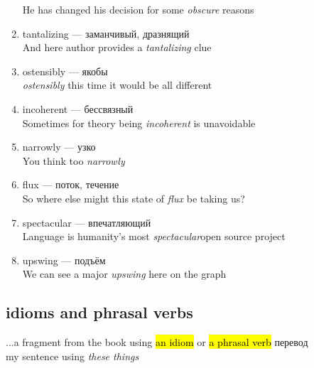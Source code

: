 \documentclass[
]{article}
\begin{document}
\begin{enumerate}
  He has changed his decision for some \emph{obscure} reasons
\item
  tantalizing --- заманчивый, дразнящий\\
  And here author provides a \emph{tantalizing} clue
\item
  ostensibly --- якобы\\
  \emph{ostensibly} this time it would be all different
\item
  incoherent --- бессвязный\\
  Sometimes for theory being \emph{incoherent} is unavoidable
\item
  narrowly --- узко\\
  You think too \emph{narrowly}
\item
  flux --- поток, течение\\
  So where else might this state of \emph{flux} be taking us?
\item
  spectacular --- впечатляющий\\
  Language is humanity's most \emph{spectacular}open source project
\item
  upswing --- подъём\\
  We can see a major \emph{upswing} here on the graph
\end{enumerate}

\subsection{idioms and phrasal verbs}\label{idioms-and-phrasal-verbs}

...a fragment from the book using \hl{an idiom} or \hl{a phrasal verb}
\textbar\textbar{} перевод\\
my sentence using \emph{these things}
\end{document}
